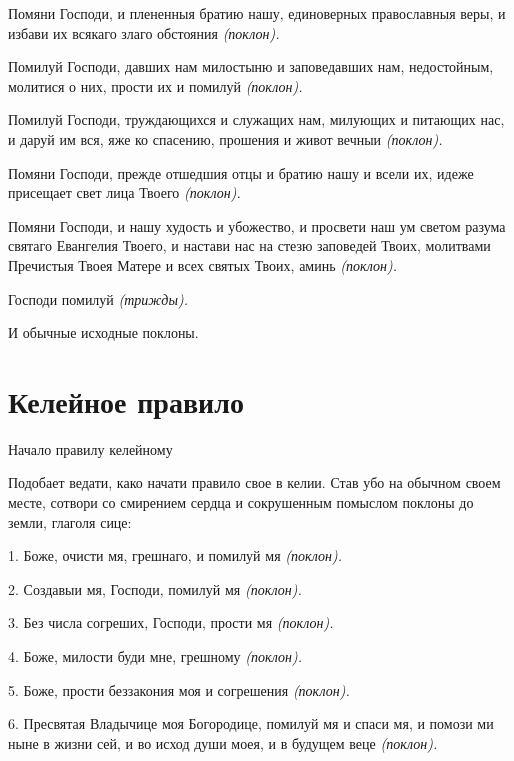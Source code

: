 Помяни Господи, и плененныя братию нашу, единоверных православныя веры, и избави их всякаго злаго обстояния \itshape (поклон)\normalfont{}.


Помилуй Господи, давших нам милостыню и заповедавших нам, недостойным, молитися о них, прости их и помилуй \itshape (поклон)\normalfont{}.


Помилуй Господи, труждающихся и служащих нам, милующих и питающих нас, и даруй им вся, яже ко спасению, прошения и живот вечныи \itshape (поклон)\normalfont{}.


Помяни Господи, прежде отшедшия отцы и братию нашу и всели их, идеже присещает свет лица Твоего \itshape (поклон)\normalfont{}.


Помяни Господи, и нашу худость и убожество, и просвети наш ум светом разума святаго Евангелия Твоего, и настави нас на стезю заповедей Твоих, молитвами Пречистыя Твоея Матере и всех святых Твоих, аминь \itshape (поклон)\normalfont{}.


Господи помилуй \itshape (трижды)\normalfont{}.


И обычные исходные поклоны.




\section{Келейное правило}
 


Начало правилу келейному


Подобает ведати, како начати правило свое в келии. Став убо на обычном своем месте, сотвори со смирением сердца и сокрушенным помыслом поклоны до земли, глаголя сице:



1. Боже, очисти мя, грешнаго, и помилуй мя \itshape (поклон)\normalfont{}.


2. Создавыи мя, Господи, помилуй мя \itshape (поклон)\normalfont{}.


3. Без числа согреших, Господи, прости мя \itshape (поклон)\normalfont{}.


4. Боже, милости буди мне, грешному \itshape (поклон)\normalfont{}.


5. Боже, прости беззакония моя и согрешения \itshape (поклон)\normalfont{}.


6. Пресвятая Владычице моя Богородице, помилуй мя и спаси мя, и помози ми ныне в жизни сей, и во исход души моея, и в будущем веце \itshape (поклон)\normalfont{}.


